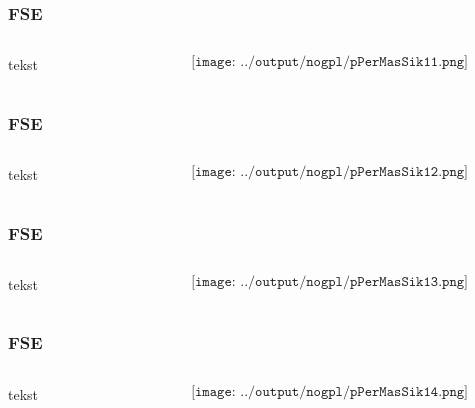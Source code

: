 \documentclass[aspectratio=169,xcolor=dvipsnames]{beamer}
\begin{document}
\begin{frame}
	\frametitle{FSE}
	\begin{columns}
		\begin{column}{0.5\textwidth}
tekst
			
		\end{column}

		\begin{column}{0.5\textwidth}
	$$\texttt{[image: ../output/nogpl/pPerMasSik11.png]}$$
		\end{column}
	\end{columns}
\end{frame}

\begin{frame}
	\frametitle{FSE}
	\begin{columns}
		\begin{column}{0.5\textwidth}
tekst
			
		\end{column}

		\begin{column}{0.5\textwidth}
	$$\texttt{[image: ../output/nogpl/pPerMasSik12.png]}$$
		\end{column}
	\end{columns}
\end{frame}

\begin{frame}
	\frametitle{FSE}
	\begin{columns}
		\begin{column}{0.5\textwidth}
tekst
			
		\end{column}

		\begin{column}{0.5\textwidth}
	$$\texttt{[image: ../output/nogpl/pPerMasSik13.png]}$$
		\end{column}
	\end{columns}
\end{frame}

\begin{frame}
	\frametitle{FSE}
	\begin{columns}
		\begin{column}{0.5\textwidth}
tekst
			
		\end{column}

		\begin{column}{0.5\textwidth}
	$$\texttt{[image: ../output/nogpl/pPerMasSik14.png]}$$
		\end{column}
	\end{columns}
\end{frame}
\end{document}
